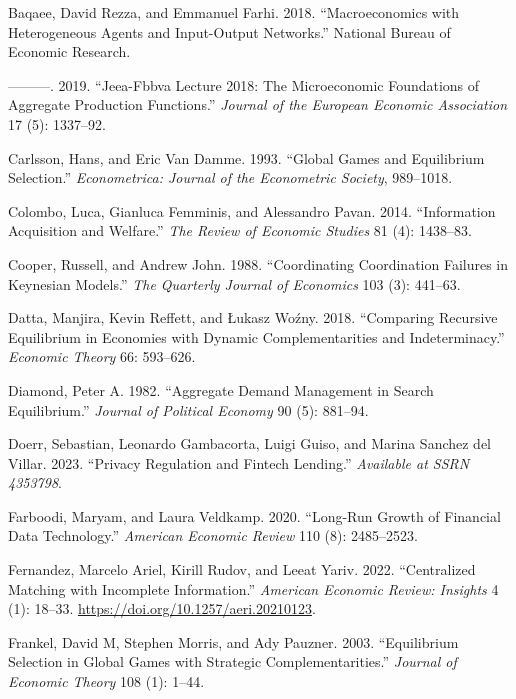 \documentclass[
]{article}
\newlength{\cslhangindent}
\newenvironment{CSLReferences}[2] %
 {\begin{list}{}{%
  \setlength{\itemindent}{0pt}
  \setlength{\leftmargin}{0pt}
  \setlength{\parsep}{0pt}
  \ifodd #1
   \setlength{\leftmargin}{\cslhangindent}
   \setlength{\itemindent}{-1\cslhangindent}
  \fi
  \setlength{\itemsep}{#2\baselineskip}}}
 {\end{list}}
\theoremstyle{definition}
\theoremstyle{plain}
\theoremstyle{remark}
\begin{document}
\begin{CSLReferences}{1}{0}
Baqaee, David Rezza, and Emmanuel Farhi. 2018. {``Macroeconomics with
Heterogeneous Agents and Input-Output Networks.''} National Bureau of
Economic Research.

---------. 2019. {``Jeea-Fbbva Lecture 2018: The Microeconomic
Foundations of Aggregate Production Functions.''} \emph{Journal of the
European Economic Association} 17 (5): 1337--92.

Carlsson, Hans, and Eric Van Damme. 1993. {``Global Games and
Equilibrium Selection.''} \emph{Econometrica: Journal of the Econometric
Society}, 989--1018.

Colombo, Luca, Gianluca Femminis, and Alessandro Pavan. 2014.
{``Information Acquisition and Welfare.''} \emph{The Review of Economic
Studies} 81 (4): 1438--83.

Cooper, Russell, and Andrew John. 1988. {``Coordinating Coordination
Failures in Keynesian Models.''} \emph{The Quarterly Journal of
Economics} 103 (3): 441--63.

Datta, Manjira, Kevin Reffett, and Łukasz Woźny. 2018. {``Comparing
Recursive Equilibrium in Economies with Dynamic Complementarities and
Indeterminacy.''} \emph{Economic Theory} 66: 593--626.

Diamond, Peter A. 1982. {``Aggregate Demand Management in Search
Equilibrium.''} \emph{Journal of Political Economy} 90 (5): 881--94.

Doerr, Sebastian, Leonardo Gambacorta, Luigi Guiso, and Marina Sanchez
del Villar. 2023. {``Privacy Regulation and Fintech Lending.''}
\emph{Available at SSRN 4353798}.

Farboodi, Maryam, and Laura Veldkamp. 2020. {``Long-Run Growth of
Financial Data Technology.''} \emph{American Economic Review} 110 (8):
2485--2523.

Fernandez, Marcelo Ariel, Kirill Rudov, and Leeat Yariv. 2022.
{``Centralized Matching with Incomplete Information.''} \emph{American
Economic Review: Insights} 4 (1): 18--33.
\url{https://doi.org/10.1257/aeri.20210123}.

Frankel, David M, Stephen Morris, and Ady Pauzner. 2003. {``Equilibrium
Selection in Global Games with Strategic Complementarities.''}
\emph{Journal of Economic Theory} 108 (1): 1--44.


\end{CSLReferences}
\end{document}
